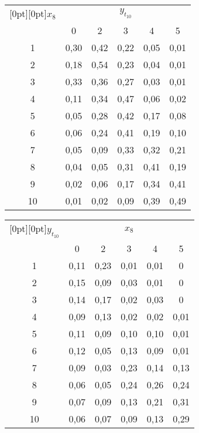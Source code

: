 \begin{multicols}{2}
\begin{table*}[b]
\begin{minipage}[t]{70mm}
\begin{center}
\tabcolsep=8.3pt
\begin{tabular}{|c|c|c|c|c|c|}
\hline
\multicolumn{1}{|c|}{\raisebox{-6pt}[0pt][0pt]{$x_8$}}&\multicolumn{5}{c|}{$y_{t_{10}}$}\\
\cline{2-6}
&0&2&3&4&5\\
\hline
1&0,30&0,42&0,22&0,05&0,01\\
2&0,18&0,54&0,23&0,04&0,01\\
3&0,33&0,36&0,27&0,03&0,01\\
4&0,11&0,34&0,47&0,06&0,02\\
5&0,05&0,28&0,42&0,17&0,08\\
6&0,06&0,24&0,41&0,19&0,10\\
7&0,05&0,09&0,33&0,32&0,21\\
8&0,04&0,05&0,31&0,41&0,19\\
9&0,02&0,06&0,17&0,34&0,41\\
10\hphantom{9}&0,01&0,02&0,09&0,39&0,49\\
\hline
\end{tabular}
\end{center}
\end{minipage}
\hfill
\vspace*{-6pt}
\begin{minipage}[t]{70mm}
\begin{center}
\vspace*{2ex}

\tabcolsep=8pt
\begin{tabular}{|c|c|c|c|c|c|}
\hline
\multicolumn{1}{|c|}{\raisebox{-6pt}[0pt][0pt]{$y_{t_{10}}$}}&\multicolumn{5}{c|}{$x_8$}\\
\cline{2-6}
&0&2&3&4&5\\
\hline
1&0,11&0,23&0,01&0,01&0\hphantom{,99}\\
2&0,15&0,09&0,03&0,01&0\hphantom{,99}\\
3&0,14&0,17&0,02&0,03&0\hphantom{,99}\\
4&0,09&0,13&0,02&0,02&0,01\\
5&0,11&0,09&0,10&0,10&0,01\\
6&0,12&0,05&0,13&0,09&0,01\\
7&0,09&0,03&0,23&0,14&0,13\\
8&0,06&0,05&0,24&0,26&0,24\\
9&0,07&0,09&0,13&0,21&0,31\\
10\hphantom{9}&0,06&0,07&0,09&0,13&0,29\\
\hline
\end{tabular}
\end{center}
\end{minipage}\hspace*{7mm}
\end{table*}



\end{multicols}
